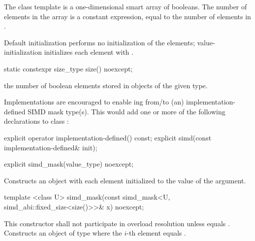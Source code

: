 

\pnum The class template \mask[<T, Abi>] is a one-dimensional smart array of booleans.
The number of elements in the array is a constant expression, equal to the number of elements in \simd[<T, Abi>].


\pnum Default initialization performs no initialization of the elements; value-initialization initializes each element with .

\begin{itemdecl}
static constexpr size_type size() noexcept;
\end{itemdecl}
\begin{itemdescr}
  \pnum\returns the number of boolean elements stored in objects of the given \mask[<T, Abi>] type.
\end{itemdescr}

\pnum\begin{noteEnv}Implementations are encouraged to enable ing from/to (an) implementation-defined SIMD mask type(s).
This would add one or more of the following declarations to class \mask:
\begin{itemdecl}
explicit operator implementation-defined() const;
explicit simd(const implementation-defined& init);
\end{itemdecl}
\end{noteEnv}

\begin{itemdecl}
explicit simd_mask(value_type) noexcept;
\end{itemdecl}
\begin{itemdescr}
  \pnum\effects Constructs an object with each element initialized to the value of the argument.
\end{itemdescr}

\begin{itemdecl}
template <class U> simd_mask(const simd_mask<U, simd_abi::fixed_size<size()>>& x) noexcept;
\end{itemdecl}
\begin{itemdescr}
  \pnum\remarks This constructor shall not participate in overload resolution unless
     equals \fixedsizescoped{}.
  \pnum\effects Constructs an object of type \mask where the $i$-th element equals  \foralli.
\end{itemdescr}

